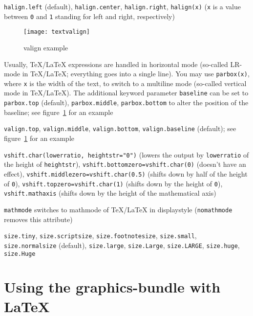 \begin{description}
\raggedright
\item[Horizontal alignment:] \verb|halign.left| (default),
\verb|halign.center|, \verb|halign.right|, \verb|halign(x)| (\verb|x|
is a value between \verb|0| and \verb|1| standing for left and right,
respectively)
\begin{figure}
\centerline{\texttt{[image: textvalign]}}
\caption{valign example}
\label{fig:textvalign}
\end{figure}
\item[Vertical box:] Usually, \TeX/\LaTeX{} expressions are handled in
horizontal mode (so-called LR-mode in \TeX/\LaTeX; everything goes
into a single line). You may use \verb|parbox(x)|, where \verb|x| is the
width of the text, to switch to a multiline mode (so-called vertical
mode in \TeX/\LaTeX). The additional keyword parameter \verb|baseline|
can be set to \verb|parbox.top| (default), \verb|parbox.middle|,
\verb|parbox.bottom| to alter the position of the baseline; see
figure~\ref{fig:textvalign} for an example
\item[Vertical alignment:] \verb|valign.top|, \verb|valign.middle|,
\verb|valign.bottom|, \verb|valign.baseline| (default); see
figure~\ref{fig:textvalign} for an example
\item[Vertical shift:] \verb|vshift.char(lowerratio, heightstr="0")|
(lowers the output by \verb|lowerratio| of the height of
\verb|heightstr|), \verb|vshift.bottomzero=vshift.char(0)| (doesn't
have an effect), \verb|vshift.middlezero=vshift.char(0.5)| (shifts
down by half of the height of \verb|0|),
\verb|vshift.topzero=vshift.char(1)| (shifts down by the height of
\verb|0|), \verb|vshift.mathaxis| (shifts down by the height of the
mathematical axis)
\item[Mathmode:] \verb|mathmode| switches to mathmode of \TeX/\LaTeX
in displaystyle (\verb|nomathmode| removes this attribute)
\item[Font size:] \verb|size.tiny|, \verb|size.scriptsize|,
\verb|size.footnotesize|, \verb|size.small|, \verb|size.normalsize|
(default), \verb|size.large|, \verb|size.Large|, \verb|size.LARGE|,
\verb|size.huge|, \verb|size.Huge|
\end{description}

\section{Using the graphics-bundle with \LaTeX}

